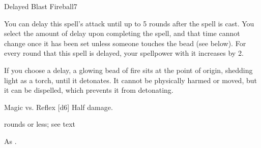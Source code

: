 \begin{spellsection}{Delayed Blast Fireball}{7}
    \begin{spellheader}
    \end{spellheader}
    \begin{spellcontent}
        \begin{spelltargetinginfo}
        \end{spelltargetinginfo}
        \begin{spelleffects}
            \spellspecial You can delay this spell's attack until up to 5 rounds after the spell is cast. You select the amount of delay upon completing the spell, and that time cannot change once it has been set unless someone touches the bead (see below). For every round that this spell is delayed, your spellpower with it increases by 2.

            If you choose a delay, a glowing bead of fire sits at the point of origin, shedding light as a torch, until it detonates. It cannot be physically harmed or moved, but it can be dispelled, which prevents it from detonating.
            \begin{spellattack}{Magic vs. Reflex}
                \spellsuccess {}[d6]
                \spellfailure Half damage.
            \end{spellattack}
             rounds or less; see text
        \end{spelleffects}
    \end{spellcontent}
    \begin{spellfooter}
        \spellnotes As .
        \miscastyou
    \end{spellfooter}
\end{spellsection}

